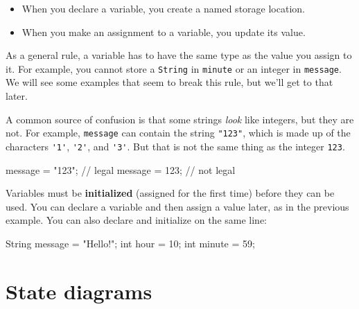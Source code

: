 \documentclass[12pt]{book}
\theoremstyle{exercise}
\newcommand{\java}[1]{\verb"#1"}
\begin{document}
\begin{itemize}
\item When you declare a variable, you create a named storage location.
\item When you make an assignment to a variable, you update its value.
\end{itemize}

As a general rule, a variable has to have the same type as the value you assign to it.
For example, you cannot store a \java{String} in \java{minute} or an integer in \java{message}.
We will see some examples that seem to break this rule, but we'll get to that later.


A common source of confusion is that some strings {\em look} like integers, but they are not.
For example, \java{message} can contain the string \verb|"123"|, which is made up of the characters \java{'1'}, \java{'2'}, and \java{'3'}.
But that is not the same thing as the integer \java{123}.

\begin{code}
    message = "123";    // legal
    message = 123;      // not legal
\end{code}


Variables must be {\bf initialized} (assigned for the first time) before they can be used.
You can declare a variable and then assign a value later, as in the previous example.
You can also declare and initialize on the same line:

\begin{code}
    String message = "Hello!";
    int hour = 10;
    int minute = 59;
\end{code}

%
%


\section{State diagrams}
\label{state}
\end{document}

